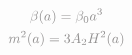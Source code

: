 \documentclass[preview]{standalone}
\begin{document}
\begin{gather}
\notag
\textcolor{Gray}{\beta(a) = \beta_0 a^3} \\ 
\notag
\textcolor{Gray}{m^2(a) = 3A_2 H^2(a)} 
\end{gather}
\end{document}
